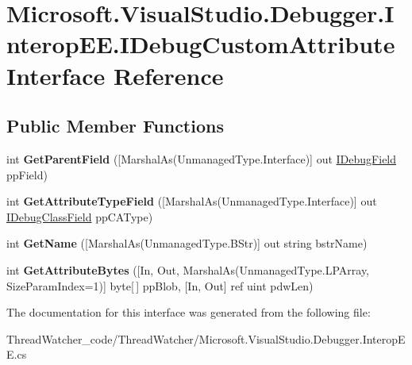 \hypertarget{interface_microsoft_1_1_visual_studio_1_1_debugger_1_1_interop_e_e_1_1_i_debug_custom_attribute}{\section{Microsoft.\+Visual\+Studio.\+Debugger.\+Interop\+E\+E.\+I\+Debug\+Custom\+Attribute Interface Reference}
\label{interface_microsoft_1_1_visual_studio_1_1_debugger_1_1_interop_e_e_1_1_i_debug_custom_attribute}
}
\subsection*{Public Member Functions}
\begin{DoxyCompactItemize}
\item 
\hypertarget{interface_microsoft_1_1_visual_studio_1_1_debugger_1_1_interop_e_e_1_1_i_debug_custom_attribute_aca5884c010d069438f5b542916f6a4ef}{int {\bfseries Get\+Parent\+Field} (\mbox{[}Marshal\+As(Unmanaged\+Type.\+Interface)\mbox{]} out \hyperlink{interface_microsoft_1_1_visual_studio_1_1_debugger_1_1_interop_e_e_1_1_i_debug_field}{I\+Debug\+Field} pp\+Field)}\label{interface_microsoft_1_1_visual_studio_1_1_debugger_1_1_interop_e_e_1_1_i_debug_custom_attribute_aca5884c010d069438f5b542916f6a4ef}

\item 
\hypertarget{interface_microsoft_1_1_visual_studio_1_1_debugger_1_1_interop_e_e_1_1_i_debug_custom_attribute_aaabd7dc655111ca61311944257f38009}{int {\bfseries Get\+Attribute\+Type\+Field} (\mbox{[}Marshal\+As(Unmanaged\+Type.\+Interface)\mbox{]} out \hyperlink{interface_microsoft_1_1_visual_studio_1_1_debugger_1_1_interop_e_e_1_1_i_debug_class_field}{I\+Debug\+Class\+Field} pp\+C\+A\+Type)}\label{interface_microsoft_1_1_visual_studio_1_1_debugger_1_1_interop_e_e_1_1_i_debug_custom_attribute_aaabd7dc655111ca61311944257f38009}

\item 
\hypertarget{interface_microsoft_1_1_visual_studio_1_1_debugger_1_1_interop_e_e_1_1_i_debug_custom_attribute_a37db4cd9927bf6bdd3b40c93d40e6d99}{int {\bfseries Get\+Name} (\mbox{[}Marshal\+As(Unmanaged\+Type.\+B\+Str)\mbox{]} out string bstr\+Name)}\label{interface_microsoft_1_1_visual_studio_1_1_debugger_1_1_interop_e_e_1_1_i_debug_custom_attribute_a37db4cd9927bf6bdd3b40c93d40e6d99}

\item 
\hypertarget{interface_microsoft_1_1_visual_studio_1_1_debugger_1_1_interop_e_e_1_1_i_debug_custom_attribute_adcdfa213f0c44ad06586bb0a18304367}{int {\bfseries Get\+Attribute\+Bytes} (\mbox{[}In, Out, Marshal\+As(Unmanaged\+Type.\+L\+P\+Array, Size\+Param\+Index=1)\mbox{]} byte\mbox{[}$\,$\mbox{]} pp\+Blob, \mbox{[}In, Out\mbox{]} ref uint pdw\+Len)}\label{interface_microsoft_1_1_visual_studio_1_1_debugger_1_1_interop_e_e_1_1_i_debug_custom_attribute_adcdfa213f0c44ad06586bb0a18304367}

\end{DoxyCompactItemize}


The documentation for this interface was generated from the following file\+:\begin{DoxyCompactItemize}
\item 
Thread\+Watcher\+\_\+code/\+Thread\+Watcher/Microsoft.\+Visual\+Studio.\+Debugger.\+Interop\+E\+E.\+cs\end{DoxyCompactItemize}
